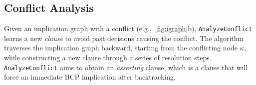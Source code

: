 \documentclass[oneside,11pt,dvipsnames]{book}
\numberwithin{equation}{section}
\theoremstyle{definition}
\theoremstyle{remark}
\begin{document}




\subsection{Conflict Analysis}\label{sec:analyze-conflicts}

Given an implication graph with a conflict (e.g.,~\autoref{fig:igraph}b), \texttt{AnalyzeConflict} learns a new \emph{clause} to avoid past decisions causing the conflict.
The algorithm traverses the implication graph backward, starting from the conflicting node $\kappa$, while constructing a new clause through a series of resolution steps.
\texttt{AnalyzeConflict} aims to obtain an \emph{asserting} clause, which is a clause that will force an immediate BCP implication after backtracking.
\end{document}
